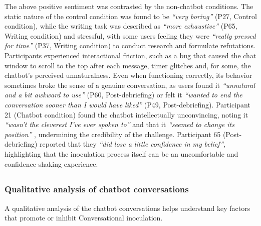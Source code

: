 \documentclass[sigconf]{acmart}
\begin{document}
The above positive sentiment was contrasted by the non-chatbot conditions. The static nature of the control condition was found to be \textit{``very boring''} (P27, Control condition), while the writing task was described as \textit{``more exhaustive''} (P65, Writing condition) and stressful, with some users feeling they were \textit{``really pressed for time''} (P37, Writing condition) to conduct research and formulate refutations. Participants experienced interactional friction, such as a bug that caused the chat window to scroll to the top after each message, timer glitches and, for some, the chatbot's perceived unnaturalness. Even when functioning correctly, its behavior sometimes broke the sense of a genuine conversation, as users found it \textit{``unnatural and a bit awkward to use''} (P60, Post-debriefing) or felt it \textit{``wanted to end the conversation sooner than I would have liked''} (P49, Post-debriefing). Participant 21 (Chatbot condition) found the chatbot intellectually unconvincing, noting it \textit{``wasn't the cleverest I've ever spoken to''} and that it \textit{``seemed to change its position''} , undermining the credibility of the challenge. Participant 65 (Post-debriefing) reported that they \textit{``did lose a little confidence in my belief''}, highlighting that the inoculation process itself can be an uncomfortable and confidence-shaking experience.

\subsection{ }


\subsubsection{Qualitative analysis of chatbot conversations}
\label{sec:qualchatbotconv}

A qualitative analysis of the chatbot conversations helps understand key factors 
that promote or inhibit Conversational inoculation.
\end{document}
